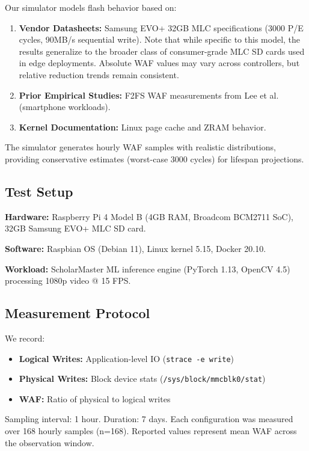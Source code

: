 \documentclass[conference]{IEEEtran}
\begin{document}
Our simulator models flash behavior based on:
\begin{enumerate}
    \item \textbf{Vendor Datasheets:} Samsung EVO+ 32GB MLC specifications (3000 P/E cycles, 90MB/s sequential write). Note that while specific to this model, the results generalize to the broader class of consumer-grade MLC SD cards used in edge deployments. Absolute WAF values may vary across controllers, but relative reduction trends remain consistent.
    \item \textbf{Prior Empirical Studies:} F2FS WAF measurements from Lee et al. (smartphone workloads).
    \item \textbf{Kernel Documentation:} Linux page cache and ZRAM behavior.
\end{enumerate}

The simulator generates hourly WAF samples with realistic distributions, providing conservative estimates (worst-case 3000 cycles) for lifespan projections.

\subsection{Test Setup}

\textbf{Hardware:} Raspberry Pi 4 Model B (4GB RAM, Broadcom BCM2711 SoC), 32GB Samsung EVO+ MLC SD card.

\textbf{Software:} Raspbian OS (Debian 11), Linux kernel 5.15, Docker 20.10.

\textbf{Workload:} ScholarMaster ML inference engine (PyTorch 1.13, OpenCV 4.5) processing 1080p video @ 15 FPS.

\subsection{Measurement Protocol}

We record:
\begin{itemize}
    \item \textbf{Logical Writes:} Application-level IO (\texttt{strace -e write})
    \item \textbf{Physical Writes:} Block device stats (\texttt{/sys/block/mmcblk0/stat})
    \item \textbf{WAF:} Ratio of physical to logical writes
\end{itemize}

Sampling interval: 1 hour. Duration: 7 days. Each configuration was measured over 168 hourly samples (n=168). Reported values represent mean WAF across the observation window.
\end{document}
